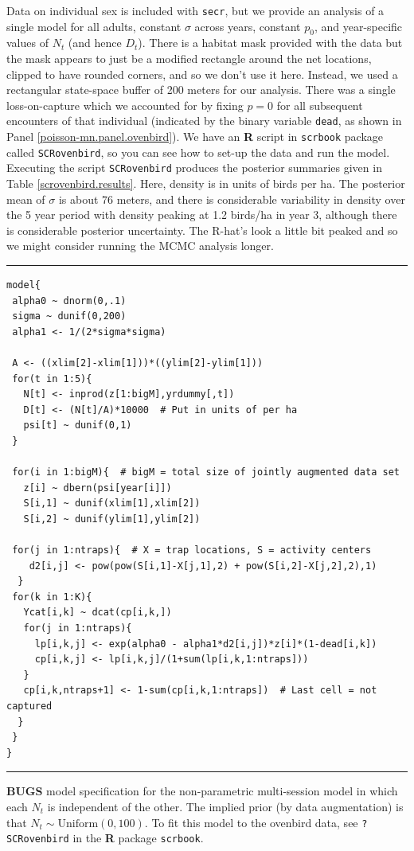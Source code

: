 Data on individual sex is included with \mbox{\tt secr}, but we
provide an analysis of a single model for all adults, constant
$\sigma$ across years, constant $p_{0}$, and year-specific values of
$N_{t}$ (and hence $D_{t}$).  There is a habitat mask provided with
the data but the mask appears to just be a modified rectangle around
the net locations, clipped to have rounded corners, and so we don't
use it here.  Instead, we used a rectangular state-space buffer of 200
meters for our analysis.  There was a single loss-on-capture which we
accounted for by fixing $p=0$ for all subsequent encounters of that
individual (indicated by the binary variable \mbox{\tt dead}, as shown
in Panel \ref{poisson-mn.panel.ovenbird}).  We have an {\bf R} script
in \mbox{\tt scrbook} package called \mbox{\tt SCRovenbird}, so you
can see how to set-up the data and run the model.  Executing the
script \mbox{\tt SCRovenbird} produces the posterior summaries given
in Table \ref{scrovenbird.results}. Here, density is in units of birds
per ha. The posterior mean of $\sigma$ is about 76 meters, and there
is considerable variability in density over the 5 year period with
density peaking at 1.2 birds/ha in year 3, although there is
considerable posterior uncertainty.  The R-hat's look a little bit
peaked and so we might consider running the MCMC analysis longer.



\begin{panel}[htp]
\centering
\rule[0.15in]{\textwidth}{.03in}
{\small
\begin{verbatim}
model{
 alpha0 ~ dnorm(0,.1)
 sigma ~ dunif(0,200)
 alpha1 <- 1/(2*sigma*sigma)

 A <- ((xlim[2]-xlim[1]))*((ylim[2]-ylim[1]))
 for(t in 1:5){
   N[t] <- inprod(z[1:bigM],yrdummy[,t])
   D[t] <- (N[t]/A)*10000  # Put in units of per ha
   psi[t] ~ dunif(0,1)
 }

 for(i in 1:bigM){  # bigM = total size of jointly augmented data set
   z[i] ~ dbern(psi[year[i]])
   S[i,1] ~ dunif(xlim[1],xlim[2])
   S[i,2] ~ dunif(ylim[1],ylim[2])

 for(j in 1:ntraps){  # X = trap locations, S = activity centers
    d2[i,j] <- pow(pow(S[i,1]-X[j,1],2) + pow(S[i,2]-X[j,2],2),1)
  }
 for(k in 1:K){
   Ycat[i,k] ~ dcat(cp[i,k,])
   for(j in 1:ntraps){
     lp[i,k,j] <- exp(alpha0 - alpha1*d2[i,j])*z[i]*(1-dead[i,k])
     cp[i,k,j] <- lp[i,k,j]/(1+sum(lp[i,k,1:ntraps]))
   }
   cp[i,k,ntraps+1] <- 1-sum(cp[i,k,1:ntraps])  # Last cell = not captured
  } 
 }  
}
\end{verbatim}
}
\rule[-0.15in]{\textwidth}{.03in}
\caption{
{\bf BUGS} model specification for the non-parametric multi-session
model in which each $N_{t}$ is independent of the other. The implied
prior (by data augmentation) is that $N_{t} \sim
\mbox{Uniform}(0,100)$.
To fit this model to the ovenbird data, see
 \mbox{\tt ?SCRovenbird} in the {\bf R} package \mbox{\tt scrbook}.
}
\label{poisson-mn.panel.ovenbird}
\end{panel}


